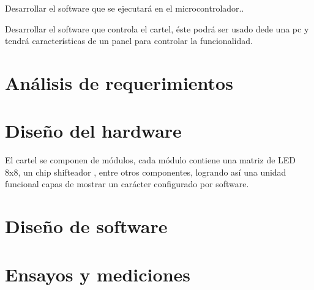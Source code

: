 Desarrollar el software que se ejecutará en el microcontrolador..

Desarrollar el software que controla el cartel, éste podrá ser usado dede una pc y tendrá características de un panel para controlar la funcionalidad.

\section{Análisis de requerimientos}


\section{Diseño del hardware}
El cartel se componen de módulos, cada módulo contiene una matriz de LED 8x8, un chip shifteador \cite{MAX}, entre otros componentes, logrando así una unidad funcional capas de mostrar un carácter configurado por software.


\section{Diseño de software}

\section{Ensayos y mediciones}

